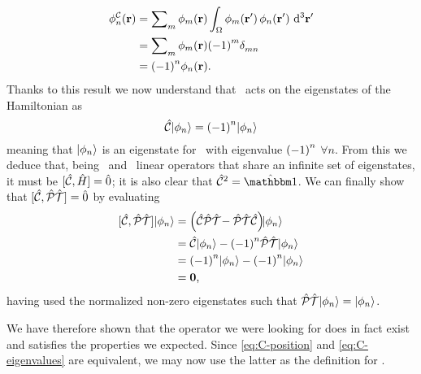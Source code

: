             \begin{align*}
                \phi_n^\mcC\pqty{\vb{r}}
                &= \sum\nolimits_m \phi_m\pqty{\vb{r}} \int\nolimits_\Omega \phi_m\pqty*{\vb{r}'} \phi_n\pqty*{\vb{r}'} \dd[3]{\vb{r}'} \\
                &= \sum\nolimits_m \phi_m\pqty{\vb{r}} \pqty{-1}^m \tensor{\delta}{_m_n} \\
                &= \pqty{-1}^n \phi_n\pqty{\vb{r}}\myperiod
            \end{align*}
            Thanks to this result we now understand that \hC\ acts on the eigenstates of the Hamiltonian as
            \begin{equation}
                \label{eq:C-eigenvalues}
                \hC\!\ket{\phi_n} = \pqty{-1}^n\!\ket{\phi_n}
            \end{equation}
            meaning that $\ket{\phi_n}$ is an eigenstate for \hC\ with eigenvalue $\pqty{-1}^n$ $\forall n$. From this we deduce that, being \hC\ and \hH\ linear operators that share an infinite set of eigenstates, it must be $\comm*{\hC}{\hH}\! = \hzero$; it is also clear that $\hC^2 = \hidM$. We can finally show that $\comm*{\hC}{\hPT}\! = \hzero$ by evaluating
            \begin{align*}
                \comm*{\hC}{\hPT}\!\!\ket{\phi_n}
                & = \pqty{\hC\hPT\! - \hPT\hC}\!\!\ket{\phi_n}\\
                & = \hC\!\ket{\phi_n} - \pqty{-1}^n\hPT\!\ket{\phi_n}\\
                & = \pqty{-1}^n\! \ket{\phi_n} - \pqty{-1}^n \!\ket{\phi_n}\\
                & = \vb{0}
                \mycomma
            \end{align*}
            having used the normalized non-zero eigenstates such that $\mathcal{\hat{P}}\mathcal{\hat{T}}\!\ket{\phi_n} = \ket{\phi_n}$.

            We have therefore shown that the operator we were looking for does in fact exist and satisfies the properties we expected. Since \eqref{eq:C-position} and \eqref{eq:C-eigenvalues} are equivalent, we may now use the latter as the definition for \hC.

